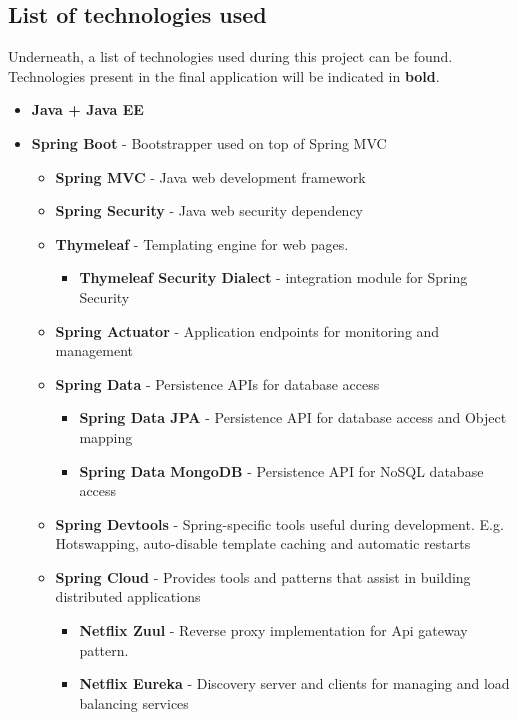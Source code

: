 \documentclass[12pt]{article}
\begin{document}
\subsection{List of technologies used}
Underneath, a list of technologies used during this project can be found. Technologies present in the final application will be indicated in \textbf{bold}.
\begin{itemize}[leftmargin=20pt]
	\item \textbf{Java + Java EE}
	\item \textbf{Spring Boot} - Bootstrapper used on top of Spring MVC
	\begin{itemize}[leftmargin=20pt]
		\item \textbf{Spring MVC} - Java web development framework
		\item \textbf{Spring Security} - Java web security dependency
		\item \textbf{Thymeleaf} - Templating engine for web pages.
		\begin{itemize}[leftmargin=20pt]
				\item  \textbf{Thymeleaf Security Dialect} - integration module for Spring Security
		\end{itemize}
		\item \textbf{Spring Actuator} - Application endpoints for monitoring and management
		\item \textbf{Spring Data} - Persistence APIs for database access
		\begin{itemize}
			\item \textbf{Spring Data JPA} - Persistence API for database access and Object mapping
			\item \textbf{Spring Data MongoDB} - Persistence API for NoSQL database access
		\end{itemize}
		\item \textbf{Spring Devtools} - Spring-specific tools useful during development. E.g. Hotswapping, auto-disable template caching and automatic restarts
		\item \textbf{Spring Cloud} - Provides tools and patterns that assist in building distributed applications
		\begin{itemize}
			\item \textbf{Netflix Zuul} - Reverse proxy implementation for Api gateway pattern.
			\item \textbf{Netflix Eureka} - Discovery server and clients for managing and load balancing services
		\end{itemize}
	\end{itemize}

\end{itemize}
\end{document}
